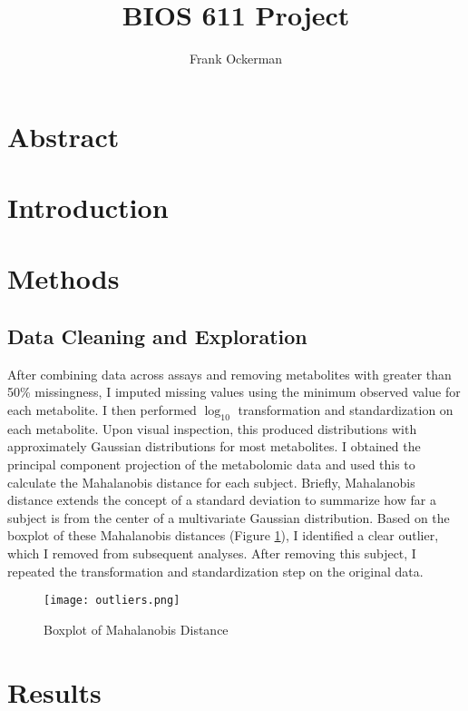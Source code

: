 \documentclass{article}
\begin{document}
\author{Frank Ockerman}
\title{BIOS 611 Project}
\maketitle
\tableofcontents

\section*{Abstract}


\section*{Introduction}


\section*{Methods}
\subsection*{Data Cleaning and Exploration}
After combining data across assays and removing metabolites with greater than 50\% missingness, I imputed missing values using the minimum observed value for each metabolite. I then performed \(\log_{10}\) transformation and standardization on each metabolite. Upon visual inspection, this produced distributions with approximately Gaussian distributions for most metabolites. I obtained the principal component projection of the metabolomic data and used this to calculate the Mahalanobis distance for each subject. Briefly, Mahalanobis distance extends the concept of a standard deviation to summarize how far a subject is from the center of a multivariate Gaussian distribution. Based on the boxplot of these Mahalanobis distances (Figure \ref{fig:mahDist}), I identified a clear outlier, which I removed from subsequent analyses. After removing this subject, I repeated the transformation and standardization step on the original data.

\begin{figure}
  \centering
  \caption{Boxplot of Mahalanobis Distance}
  \texttt{[image: outliers.png]}
  \label{fig:mahDist}
  \end{figure}

\section*{Results}
\end{document}
